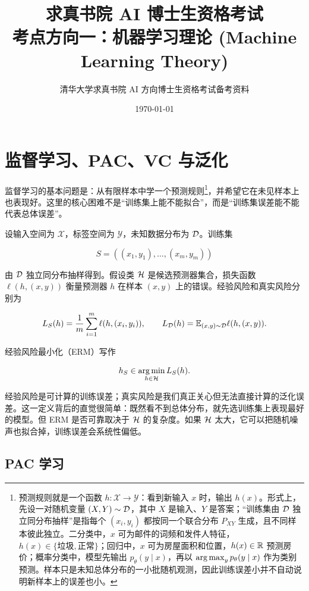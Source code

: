 \documentclass[11pt]{ctexart}
\title{\bfseries 求真书院 AI 博士生资格考试\\考点方向一：机器学习理论 (Machine Learning Theory)}
\author{清华大学求真书院 AI 方向博士生资格考试备考资料}
\date{\today}
\begin{document}
\maketitle
\tableofcontents

\label{sec:ml_theory}
\section{监督学习、PAC、VC 与泛化}

\begin{teaching}
监督学习的基本问题是：从有限样本中学一个预测规则\footnote{预测规则就是一个函数 \(h:\mathcal{X}\to\mathcal{Y}\)：看到新输入 \(x\) 时，输出 \(h(x)\)。形式上，先设一对随机变量 \((X,Y)\sim\mathcal{D}\)，其中 \(X\) 是输入、\(Y\) 是答案；“训练集由 \(\mathcal{D}\) 独立同分布抽样”是指每个 \((x_i,y_i)\) 都按同一个联合分布 \(P_{XY}\) 生成，且不同样本彼此独立。二分类中，\(x\) 可为邮件的词频和发件人特征，\(h(x)\in\{\text{垃圾},\text{正常}\}\)；回归中，\(x\) 可为房屋面积和位置，\(h(x)\in\mathbb{R}\) 预测房价；概率分类中，模型先输出 \(p_\theta(y\mid x)\)，再以 \(\operatorname*{arg\,max}_y p_\theta(y\mid x)\) 作为类别预测。样本只是未知总体分布的一小批随机观测，因此训练误差小并不自动说明新样本上的误差也小。}，并希望它在未见样本上也表现好。这里的核心困难不是“训练集上能不能拟合”，而是“训练集误差能不能代表总体误差”。
\end{teaching}


\begin{definition}
设输入空间为 \(\mathcal{X}\)，标签空间为 \(\mathcal{Y}\)，未知数据分布为 \(\mathcal{D}\)。训练集

\[
  S=((x_1,y_1),\ldots,(x_m,y_m))
\]

由 \(\mathcal{D}\) 独立同分布抽样得到。假设类 \(\mathcal{H}\) 是候选预测器集合，损失函数 \(\ell(h,(x,y))\) 衡量预测器 \(h\) 在样本 \((x,y)\) 上的错误。经验风险和真实风险分别为

\[
  L_S(h)=\frac1m\sum_{i=1}^{m}\ell(h,(x_i,y_i)),
  \qquad
  L_{\mathcal{D}}(h)=\mathbb{E}_{(x,y)\sim\mathcal{D}}\ell(h,(x,y)).
\]

经验风险最小化（ERM）写作

\[
  h_S\in \operatorname*{arg\,min}_{h\in\mathcal{H}}L_S(h).
\]
\end{definition}

经验风险是可计算的训练误差；真实风险是我们真正关心但无法直接计算的泛化误差。这一定义背后的直觉很简单：既然看不到总体分布，就先选训练集上表现最好的模型。但 ERM 是否可靠取决于 \(\mathcal{H}\) 的复杂度。如果 \(\mathcal{H}\) 太大，它可以把随机噪声也拟合掉，训练误差会系统性偏低。

\subsection{PAC 学习}
\end{document}
